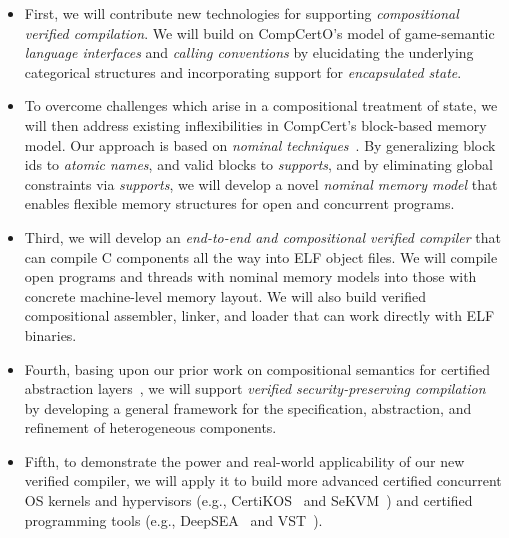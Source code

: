 \begin{itemize}
\item First, we will contribute new technologies for supporting {\em
  compositional verified compilation}.
  We will build on CompCertO's model of
  game-semantic {\em language interfaces} and {\em calling conventions}
  by elucidating the underlying categorical structures
  and incorporating support for {\em encapsulated state}.
\item To overcome challenges which arise
  in a compositional treatment of state,
  we will then address existing inflexibilities
  in CompCert's block-based memory model.
  Our approach is based on \emph{nominal
  techniques}~\cite{pitts-nominal,gabby2002}. By generalizing block
  ids to {\em atomic names}, and valid blocks to {\em supports}, and by
  eliminating global constraints via {\em supports}, we will develop a
  novel {\em nominal memory model} that enables flexible memory
  structures for open and concurrent programs.
\item Third, we will develop an {\em end-to-end and compositional
  verified compiler} that can compile C components all the way into
  ELF object files. We will compile open programs and threads with
  nominal memory models into those with concrete machine-level memory
  layout. We will also build verified compositional assembler,
  linker, and loader that can work directly with ELF binaries.
\item Fourth, basing upon our prior work on compositional semantics
  for certified abstraction layers~\cite{dscal15,ccal18,koenig20,layered22},
  we will support {\em verified security-preserving
  compilation}~\cite{costanzo16} by developing a general framework
  for the specification, abstraction, and refinement of heterogeneous
  components.
\item Fifth, to demonstrate the power and real-world applicability of
  our new verified compiler, we will apply it to build more advanced
  certified concurrent OS kernels and hypervisors (e.g., CertiKOS~\cite{certikos-osdi16}
  and SeKVM~\cite{sekvm21a,sekvm21b,tao21}) and certified programming tools
    (e.g., DeepSEA~\cite{deepsea19} and VST~\cite{appel11:vst}).
\end{itemize}
